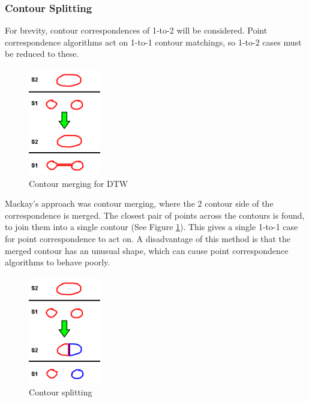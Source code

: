 \documentclass[11p, titlepage]{article}
\begin{document}
\subsubsection{Contour Splitting}

For brevity, contour correspondences of 1-to-2 will be considered. Point correspondence algorithms act on 1-to-1 contour matchings, so 1-to-2 cases must be reduced to these. 

\begin{figure}[h!]
\centering
\includegraphics[width=0.28\textwidth]{diagrams/contour_merging}
\caption{Contour merging for DTW \label{fig:contour_merging}}
\end{figure}

Mackay's approach was contour merging, where the 2 contour side of the correspondence is merged. The closest pair of points across the contours is found, to join them into a single contour (See Figure \ref{fig:contour_merging}). This gives a single 1-to-1 case for point correspondence to act on. A disadvantage of this method is that the merged contour has an unusual shape, which can cause point correspondence algorithms to behave poorly.

\begin{figure}[h!]
\centering
\includegraphics[width=0.28\textwidth]{diagrams/contour_splitting}
\caption{Contour splitting \label{fig:contour_splitting}}
\end{figure}
\end{document}
